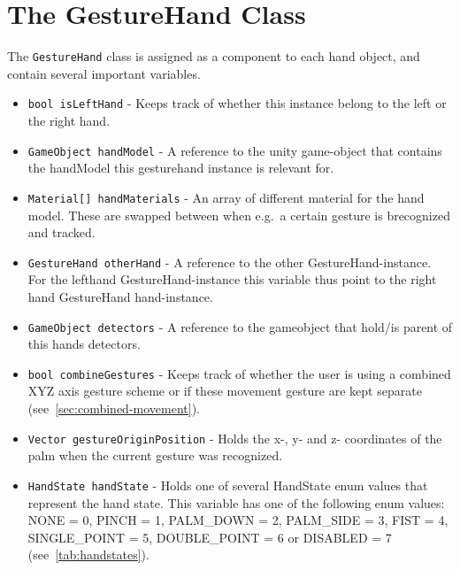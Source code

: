 \section{The GestureHand Class}
The \texttt{GestureHand} class is assigned as a component to each hand object, and contain several important variables.
\begin{itemize}
	\item \texttt{bool isLeftHand} - Keeps track of whether this instance belong to the left or the right hand.
	\item \texttt{GameObject handModel} - A reference to the unity game-object that contains the handModel this gesturehand instance is relevant for.
	\item \texttt{Material[] handMaterials} - An array of different material for the hand model. These are swapped between when e.g.~a certain gesture is brecognized and tracked.
	\item \texttt{GestureHand otherHand} - A reference to the other GestureHand-instance. For the lefthand GestureHand-instance this variable thus point to the right hand GestureHand
			hand-instance.
	\item \texttt{GameObject detectors} - A reference to the gameobject that hold/is parent of this hands detectors.
	\item \texttt{bool combineGestures} - Keeps track of whether the user is using a combined XYZ axis gesture scheme or if these movement gesture are kept separate (see~\vref{sec:combined-movement}).
	\item \texttt{Vector gestureOriginPosition} - Holds the x-, y- and z- coordinates of the palm when the current gesture was recognized.
	\item \texttt{HandState handState} - Holds one of several HandState enum values that represent the hand state. This variable has one of the following enum values:
			NONE = 0, PINCH = 1, PALM\_DOWN = 2, PALM\_SIDE = 3, FIST = 4, SINGLE\_POINT = 5, DOUBLE\_POINT = 6 or DISABLED = 7 (see~\vref{tab:handstates}).  
\end{itemize}

